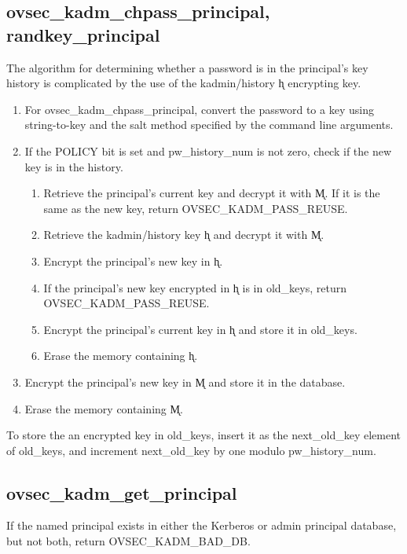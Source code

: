 \subsection{ovsec_kadm_chpass_principal, randkey_principal}

The algorithm for determining whether a password is in the principal's
key history is complicated by the use of the kadmin/history \k{h}
encrypting key.  

\begin{enumerate}
\item For ovsec_kadm_chpass_principal, convert the password to a key
using string-to-key and the salt method specified by the command line
arguments.

\item If the POLICY bit is set and pw_history_num is not zero, check
if the new key is in the history.
\begin{enumerate}
\item Retrieve the principal's current key and decrypt it with \k{M}.
If it is the same as the new key, return OVSEC_KADM_PASS_REUSE.
\item Retrieve the kadmin/history key \k{h} and decrypt it with \k{M}.
\item Encrypt the principal's new key in \k{h}.
\item If the principal's new key encrypted in \k{h} is in old_keys,
return OVSEC_KADM_PASS_REUSE.
\item Encrypt the principal's current key in \k{h} and store it in
old_keys.
\item Erase the memory containing \k{h}.
\end{enumerate}

\item Encrypt the principal's new key in \k{M} and store it in the
database.
\item Erase the memory containing \k{M}.
\end{enumerate}

To store the an encrypted key in old_keys, insert it as the
next_old_key element of old_keys, and increment next_old_key by one
modulo pw_history_num.

\subsection{ovsec_kadm_get_principal}

If the named principal exists in either the Kerberos or admin
principal database, but not both, return OVSEC_KADM_BAD_DB.


